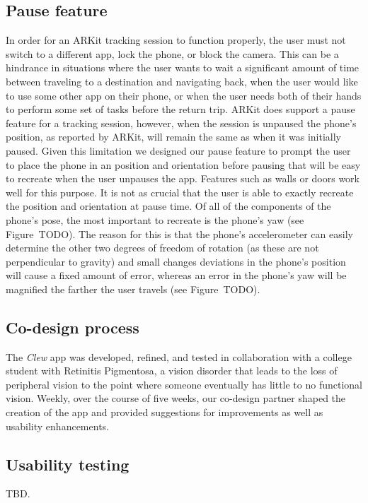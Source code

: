 \documentclass[chi_draft]{sigchi}
\begin{document}
\subsection{Pause feature}
In order for an ARKit tracking session to function properly, the user must not switch to a different app, lock the phone, or block the camera.  This can be a hindrance in situations where the user wants to wait a significant amount of time between traveling to a destination and navigating back, when the user would like to use some other app on their phone, or when the user needs both of their hands to perform some set of tasks before the return trip.  ARKit does support a pause feature for a tracking session, however, when the session is unpaused the phone's position, as reported by ARKit, will remain the same as when it was initially paused.  Given this limitation we designed our pause feature to prompt the user to place the phone in an position and orientation before pausing that will be easy to recreate when the user unpauses the app.  Features such as walls or doors work well for this purpose.  It is not as crucial that the user is able to exactly recreate the position and orientation at pause time.  Of all of the components of the phone's pose, the most important to recreate is the phone's yaw (see Figure~TODO).  The reason for this is that the phone's accelerometer can easily determine the other two degrees of freedom of rotation (as these are not perpendicular to gravity) and small changes deviations in the phone's position will cause a fixed amount of error, whereas an error in the phone's yaw will be magnified the farther the user travels (see Figure~TODO).

\subsection{Co-design process}
The \emph{Clew} app was developed, refined, and tested in collaboration with a college student with Retinitis Pigmentosa, a vision disorder that leads to the loss of peripheral vision to the point where someone eventually has little to no functional vision.  Weekly, over the course of five weeks, our co-design partner shaped the creation of the app and provided suggestions for improvements as well as usability enhancements.

\subsection{Usability testing}
TBD.
\end{document}

